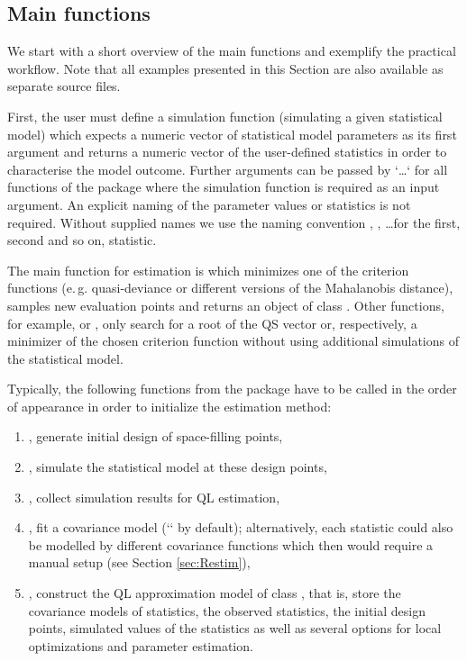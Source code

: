 \documentclass[article, nojss]{jss}
\numberwithin{equation}{section}			%
\begin{document}
\subsection{Main functions}
We start with a short overview of the main functions and exemplify
the practical workflow. Note that all examples presented in this Section are
also available as separate  source files.\par
First, the user must define a simulation function (simulating a given
statistical model) which expects a numeric vector of statistical model
parameters as its first argument and returns a numeric vector of the user-defined
statistics in order to characterise the model outcome. Further arguments can be
passed by `\ldots` for all functions of the package where the simulation function is required
as an input argument. An explicit naming of the parameter values or statistics
is not required. Without supplied names we use the naming convention , , \ldots for the first,
second and so on, statistic.\par
%
The main function for estimation is  which minimizes one of the
criterion functions (e.\,g. quasi-deviance or different versions of
the Mahalanobis distance), samples new evaluation points and returns an object
of class . Other functions, for example,  or ,
only search for a root of the QS vector or, respectively, a minimizer
of the chosen criterion function without using additional simulations of the statistical model.\par
%
Typically, the following functions from the package have to be called in the
order of appearance in order to initialize the estimation method:
%
\begin{enumerate}%
  \item {}, generate initial design of space-filling points,
  \item {}, simulate the statistical model at these design points,
  \item {}, collect simulation results for QL estimation,
  \item {}, fit a covariance model (`` by default);
  alternatively, each statistic could also be modelled by different covariance
  functions which then would require a manual setup (see Section \ref{sec:Restim}),
  \item {}, construct the QL approximation model of class ,
  that is, store the covariance models of statistics, the observed statistics,
  the initial design points, simulated values of the statistics as well
  as several options for local optimizations and parameter estimation.
\end{enumerate}
\end{document}
